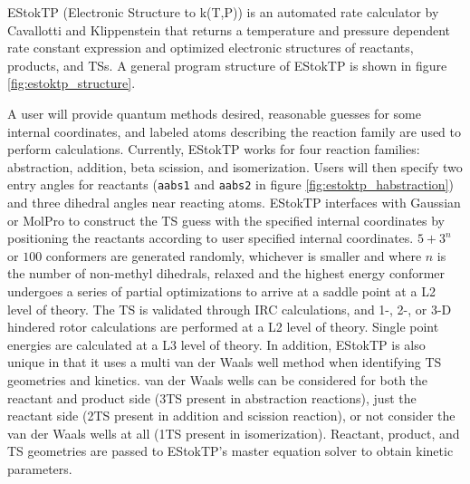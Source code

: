 \documentclass[preprint, 11pt]{elsarticle} %
\begin{document}
EStokTP (Electronic Structure to k(T,P)) \cite{Cavallotti:2019jctc} is an automated rate calculator by Cavallotti and Klippenstein that returns a temperature and pressure dependent rate constant expression and optimized electronic structures of reactants, products, and TSs.
A general program structure of EStokTP is shown in figure \ref{fig:estoktp_structure}.

A user will provide quantum methods desired, reasonable guesses for some internal coordinates, and labeled atoms describing the reaction family are used to perform calculations.
Currently, EStokTP works for four reaction families: abstraction, addition, beta scission, and isomerization. 
Users will then specify two entry angles for reactants (\texttt{aabs1} and \texttt{aabs2} in figure \ref{fig:estoktp_habstraction}) and three dihedral angles near reacting atoms.
EStokTP interfaces with Gaussian \cite{Gaussian:2009} or MolPro \cite{molpro:2012} to construct the TS guess with the specified internal coordinates by positioning the reactants according to user specified internal coordinates. 
$5 + 3^n$ or $100$ conformers are generated randomly, whichever is smaller and where $n$ is the number of non-methyl dihedrals, relaxed and the highest energy conformer undergoes a series of partial optimizations to arrive at a saddle point at a L2 level of theory. 
The TS is validated  through IRC calculations, and 1-, 2-, or 3-D hindered rotor calculations are performed at a L2 level of theory.
Single point energies are calculated at a L3 level of theory.
In addition, EStokTP is also unique in that it uses a multi van der Waals well method when identifying TS geometries and kinetics.
van der Waals wells can be considered for both the reactant and product side (3TS present in abstraction reactions), just the reactant side (2TS present in addition and scission reaction), or not consider the van der Waals wells at all (1TS present in isomerization).
Reactant, product, and TS geometries are passed to EStokTP's master equation solver to obtain kinetic parameters.
\end{document}
